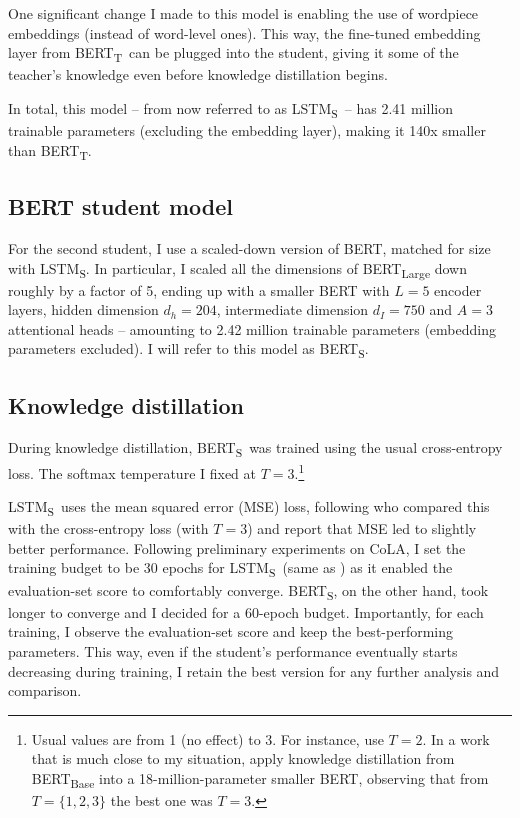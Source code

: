 \documentclass[bsc,frontabs,twoside,singlespacing,parskip,deptreport]{infthesis}
\def\BERTT{BERT\textsubscript{T}}
\def\BERTS{BERT\textsubscript{S}}
\def\LSTMS{LSTM\textsubscript{S}}
\begin{document}
{{{      One significant change I made to this model is enabling the use of wordpiece embeddings (instead of word-level ones). This way, the fine-tuned embedding layer from \BERTT~can be plugged into the student, giving it some of the teacher's knowledge even before knowledge distillation begins.

      In total, this model -- from now referred to as \LSTMS~-- has 2.41 million trainable parameters (excluding the embedding layer), making it 140x smaller than \BERTT.
    }

    \subsection{BERT student model}{
      For the second student, I use a scaled-down version of BERT, matched for size with \LSTMS. In particular, I scaled all the dimensions of BERT\textsubscript{Large} down roughly by a factor of 5, ending up with a smaller BERT with $L=5$ encoder layers, hidden dimension $d_h=204$, intermediate dimension $d_I=750$ and $A=3$ attentional heads -- amounting to 2.42 million trainable parameters (embedding parameters excluded). I will refer to this model as \BERTS.
    }

    \subsection{Knowledge distillation}{
      During knowledge distillation, \BERTS~was trained using the usual cross-entropy loss. The softmax temperature I fixed at $T=3$.\footnote{Usual values are from 1 (no effect) to 3. For instance, \citet{Sanh_2019} use $T=2$. In a work that is much close to my situation, \citet{Tsai_2019} apply knowledge distillation from BERT\textsubscript{Base} into a 18-million-parameter smaller BERT, observing that from $T=\{1, 2, 3\}$ the best one was $T=3$.}
      
      \LSTMS~uses the mean squared error (MSE) loss, following \citeauthor{Tang_2019b} who compared this with the cross-entropy loss (with $T=3$) and report that MSE led to slightly better performance. Following preliminary experiments on CoLA, I set the training budget to be 30 epochs for \LSTMS~(same as \citeauthor{Tang_2019b}) as it enabled the evaluation-set score to comfortably converge. \BERTS, on the other hand, took longer to converge and I decided for a 60-epoch budget. Importantly, for each training, I observe the evaluation-set score and keep the best-performing parameters. This way, even if the student's performance eventually starts decreasing during training, I retain the best version for any further analysis and comparison.

}}}
\end{document}
